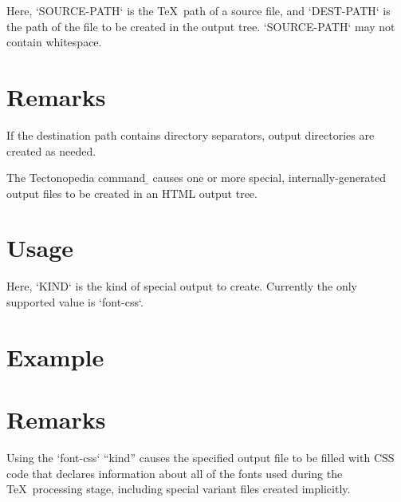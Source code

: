 Here, \tex`SOURCE-PATH` is the \TeX\ path of a source file, and \tex`DEST-PATH`
is the path of the file to be created in the output tree. \tex`SOURCE-PATH` may
not contain whitespace.

\section*{Remarks}

If the destination path contains directory separators, output directories are
created as needed.



The Tectonopedia command \b{\string\tduxProvideSpecial} causes one or more
special, internally-generated output files to be created in an HTML output tree.

\section*{Usage}

\begin{texdisp}
\end{texdisp}

Here, \tex`KIND` is the kind of special output to create. Currently the only
supported value is \tex`font-css`.

\section*{Example}

\begin{texdisp}
\end{texdisp}

\section*{Remarks}

Using the \tex`font-css` “kind” causes the specified output file to be filled
with CSS code that declares information about all of the fonts used during the
\TeX\ processing stage, including special variant files created implicitly.
